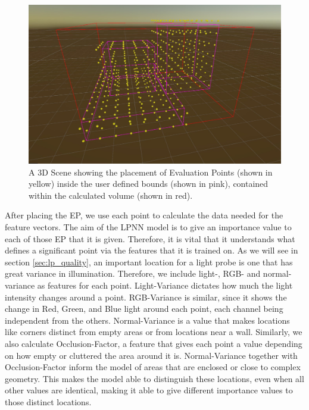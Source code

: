 \begin{figure}[h]
	\centering
	\includegraphics[width=\linewidth]{Graphics/Grid_Example.jpg}
	\caption{A 3D Scene showing the placement of Evaluation Points (shown in yellow) inside the user defined bounds (shown in pink), contained within the calculated volume (shown in red).}
	\label{fig:grid}
\end{figure}

After placing the EP, we use each point to calculate the data needed for the feature vectors. The aim of the LPNN model is to give an importance value to each of those EP that it is given. Therefore, it is vital that it understands what defines a significant point via the features that it is trained on. As we will see in section \ref{sec:lp_quality}, an important location for a light probe is one that has great variance in illumination. Therefore, we include light-, RGB- and normal-variance as features for each point. Light-Variance dictates how much the light intensity changes around a point. RGB-Variance is similar, since it shows the change in Red, Green, and Blue light around each point, each channel being independent from the others. Normal-Variance is a value that makes locations like corners distinct from empty areas or from locations near a wall. Similarly, we also calculate Occlusion-Factor, a feature that gives each point a value depending on how empty or cluttered the area around it is. Normal-Variance together with Occlusion-Factor inform the model of areas that are enclosed or close to complex geometry. This makes the model able to distinguish these locations, even when all other values are identical, making it able to give different importance values to those distinct locations.\newline

